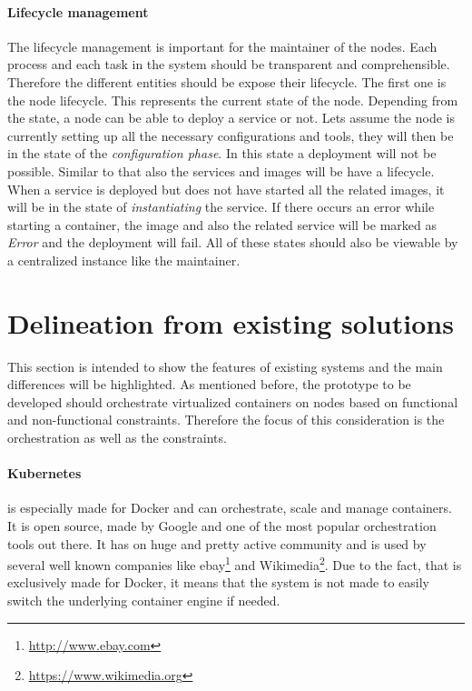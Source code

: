 \paragraph{Lifecycle management}
The lifecycle management is important for the maintainer of the nodes.
Each process and each task in the system should be transparent and comprehensible.
Therefore the different entities should be expose their lifecycle.
The first one is the node lifecycle.
This represents the current state of the node.
Depending from the state, a node can be able to deploy a service or not.
Lets assume the node is currently setting up all the necessary configurations and tools, they will then be in the state of the \textit{configuration phase}.
In this state a deployment will not be possible.
Similar to that also the services and images will be have a lifecycle.
When a service is deployed but does not have started all the related images, it will be in the state of \textit{instantiating} the service.
If there occurs an error while starting a container, the image and also the related service will be marked as \textit{Error} and the deployment will fail.
All of these states should also be viewable by a centralized instance like the maintainer.


\section{Delineation from existing solutions}
\label{section:delineation-from-existing-solutions}
This section is intended to show the features of existing systems and the main differences will be highlighted.
As mentioned before, the prototype to be developed should orchestrate virtualized containers on nodes based on functional and non-functional constraints.
Therefore the focus of this consideration is the orchestration as well as the constraints.

\paragraph{Kubernetes} is especially made for Docker and can orchestrate, scale and manage containers.
It is open source, made by Google and one of the most popular orchestration tools out there.
It has on huge and pretty active community and is used by several well known companies\autocite{Kubernetes:Case-Studies} like ebay\footnote{\url{http://www.ebay.com}} and Wikimedia\footnote{\url{https://www.wikimedia.org}}.
Due to the fact, that is exclusively made for Docker, it means that the system is not made to easily switch the underlying container engine if needed.

